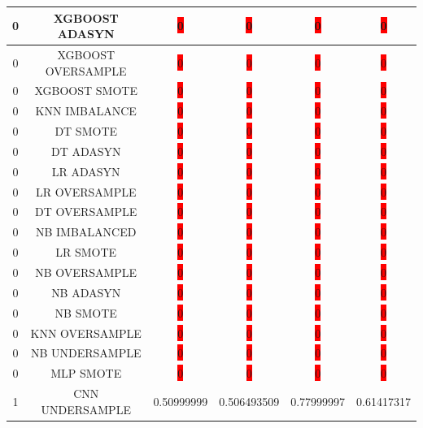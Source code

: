 \begin{longtable}{|c|c|c|c|c|c|}
	0 & XGBOOST ADASYN & \colorbox{red}{0} & \colorbox{red}{0} & \colorbox{red}{0} & \colorbox{red}{0}\\ \hline
	0 & XGBOOST OVERSAMPLE & \colorbox{red}{0} & \colorbox{red}{0} & \colorbox{red}{0} & \colorbox{red}{0}\\ \hline
	0 & XGBOOST SMOTE & \colorbox{red}{0} & \colorbox{red}{0} & \colorbox{red}{0} & \colorbox{red}{0}\\ \hline
	0 & KNN IMBALANCE & \colorbox{red}{0} & \colorbox{red}{0} & \colorbox{red}{0} & \colorbox{red}{0}\\ \hline
	0 & DT SMOTE & \colorbox{red}{0} & \colorbox{red}{0} & \colorbox{red}{0} & \colorbox{red}{0}\\ \hline
	0 & DT ADASYN & \colorbox{red}{0} & \colorbox{red}{0} & \colorbox{red}{0} & \colorbox{red}{0}\\ \hline
	0 & LR ADASYN & \colorbox{red}{0} & \colorbox{red}{0} & \colorbox{red}{0} & \colorbox{red}{0}\\ \hline
	0 & LR OVERSAMPLE & \colorbox{red}{0} & \colorbox{red}{0} & \colorbox{red}{0} & \colorbox{red}{0}\\ \hline
	0 & DT OVERSAMPLE & \colorbox{red}{0} & \colorbox{red}{0} & \colorbox{red}{0} & \colorbox{red}{0}\\ \hline
	0 & NB IMBALANCED & \colorbox{red}{0} & \colorbox{red}{0} & \colorbox{red}{0} & \colorbox{red}{0}\\ \hline
	0 & LR SMOTE & \colorbox{red}{0} & \colorbox{red}{0} & \colorbox{red}{0} & \colorbox{red}{0}\\ \hline
	0 & NB OVERSAMPLE & \colorbox{red}{0} & \colorbox{red}{0} & \colorbox{red}{0} & \colorbox{red}{0}\\ \hline
	0 & NB ADASYN & \colorbox{red}{0} & \colorbox{red}{0} & \colorbox{red}{0} & \colorbox{red}{0}\\ \hline
	0 & NB SMOTE & \colorbox{red}{0} & \colorbox{red}{0} & \colorbox{red}{0} & \colorbox{red}{0}\\ \hline
	0 & KNN OVERSAMPLE & \colorbox{red}{0} & \colorbox{red}{0} & \colorbox{red}{0} & \colorbox{red}{0}\\ \hline
	0 & NB UNDERSAMPLE & \colorbox{red}{0} & \colorbox{red}{0} & \colorbox{red}{0} & \colorbox{red}{0}\\ \hline
	0 & MLP SMOTE & \colorbox{red}{0} & \colorbox{red}{0} & \colorbox{red}{0} & \colorbox{red}{0}\\ \hline
	1 & CNN UNDERSAMPLE & 0.50999999 & 0.506493509 & 0.77999997 & 0.61417317\\ \hline

\end{longtable}

